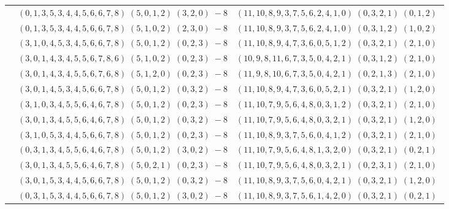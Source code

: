 \documentclass[11pt]{article}
\begin{document}
\begin{longtable}[l]{|c|c|c|}
 \cline{2-3} 
 & $(0 ,1 ,3 ,5 ,3 ,4 ,4 ,5 ,6 ,6 ,7 ,8) \;(5 ,0 ,1 ,2) \;(3 ,2 ,0) \;-8$ & $(11 ,10 ,8 ,9 ,3 ,7 ,5 ,6 ,2 ,4 ,1 ,0) \;(0 ,3 ,2 ,1) \;(0 ,1 ,2) \;$\\ 
 \cline{2-3} 
 & $(0 ,1 ,3 ,5 ,3 ,4 ,4 ,5 ,6 ,6 ,7 ,8) \;(5 ,1 ,0 ,2) \;(2 ,3 ,0) \;-8$ & $(11 ,10 ,8 ,9 ,3 ,7 ,5 ,6 ,2 ,4 ,1 ,0) \;(0 ,3 ,1 ,2) \;(1 ,0 ,2) \;$\\ 
 \cline{2-3} 
 & $(3 ,1 ,0 ,4 ,5 ,3 ,4 ,5 ,6 ,6 ,7 ,8) \;(5 ,0 ,1 ,2) \;(0 ,2 ,3) \;-8$ & $(11 ,10 ,8 ,9 ,4 ,7 ,3 ,6 ,0 ,5 ,1 ,2) \;(0 ,3 ,2 ,1) \;(2 ,1 ,0) \;$\\ 
 \cline{2-3} 
 & $(3 ,0 ,1 ,4 ,3 ,4 ,5 ,5 ,6 ,7 ,8 ,6) \;(5 ,1 ,0 ,2) \;(0 ,2 ,3) \;-8$ & $(10 ,9 ,8 ,11 ,6 ,7 ,3 ,5 ,0 ,4 ,2 ,1) \;(0 ,3 ,1 ,2) \;(2 ,1 ,0) \;$\\ 
 \cline{2-3} 
 & $(3 ,0 ,1 ,4 ,3 ,4 ,5 ,5 ,6 ,7 ,6 ,8) \;(5 ,1 ,2 ,0) \;(0 ,2 ,3) \;-8$ & $(11 ,9 ,8 ,10 ,6 ,7 ,3 ,5 ,0 ,4 ,2 ,1) \;(0 ,2 ,1 ,3) \;(2 ,1 ,0) \;$\\ 
 \cline{2-3} 
 & $(3 ,0 ,1 ,4 ,5 ,3 ,4 ,5 ,6 ,6 ,7 ,8) \;(5 ,0 ,1 ,2) \;(0 ,3 ,2) \;-8$ & $(11 ,10 ,8 ,9 ,4 ,7 ,3 ,6 ,0 ,5 ,2 ,1) \;(0 ,3 ,2 ,1) \;(1 ,2 ,0) \;$\\ 
 \cline{2-3} 
 & $(3 ,1 ,0 ,3 ,4 ,5 ,5 ,6 ,4 ,6 ,7 ,8) \;(5 ,0 ,1 ,2) \;(0 ,2 ,3) \;-8$ & $(11 ,10 ,7 ,9 ,5 ,6 ,4 ,8 ,0 ,3 ,1 ,2) \;(0 ,3 ,2 ,1) \;(2 ,1 ,0) \;$\\ 
 \cline{2-3} 
 & $(3 ,0 ,1 ,3 ,4 ,5 ,5 ,6 ,4 ,6 ,7 ,8) \;(5 ,0 ,1 ,2) \;(0 ,3 ,2) \;-8$ & $(11 ,10 ,7 ,9 ,5 ,6 ,4 ,8 ,0 ,3 ,2 ,1) \;(0 ,3 ,2 ,1) \;(1 ,2 ,0) \;$\\ 
 \cline{2-3} 
 & $(3 ,1 ,0 ,5 ,3 ,4 ,4 ,5 ,6 ,6 ,7 ,8) \;(5 ,0 ,1 ,2) \;(0 ,2 ,3) \;-8$ & $(11 ,10 ,8 ,9 ,3 ,7 ,5 ,6 ,0 ,4 ,1 ,2) \;(0 ,3 ,2 ,1) \;(2 ,1 ,0) \;$\\ 
 \cline{2-3} 
 & $(0 ,3 ,1 ,3 ,4 ,5 ,5 ,6 ,4 ,6 ,7 ,8) \;(5 ,0 ,1 ,2) \;(3 ,0 ,2) \;-8$ & $(11 ,10 ,7 ,9 ,5 ,6 ,4 ,8 ,1 ,3 ,2 ,0) \;(0 ,3 ,2 ,1) \;(0 ,2 ,1) \;$\\ 
 \cline{2-3} 
 & $(3 ,0 ,1 ,3 ,4 ,5 ,5 ,6 ,4 ,6 ,7 ,8) \;(5 ,0 ,2 ,1) \;(0 ,2 ,3) \;-8$ & $(11 ,10 ,7 ,9 ,5 ,6 ,4 ,8 ,0 ,3 ,2 ,1) \;(0 ,2 ,3 ,1) \;(2 ,1 ,0) \;$\\ 
 \cline{2-3} 
 & $(3 ,0 ,1 ,5 ,3 ,4 ,4 ,5 ,6 ,6 ,7 ,8) \;(5 ,0 ,1 ,2) \;(0 ,3 ,2) \;-8$ & $(11 ,10 ,8 ,9 ,3 ,7 ,5 ,6 ,0 ,4 ,2 ,1) \;(0 ,3 ,2 ,1) \;(1 ,2 ,0) \;$\\ 
 \cline{2-3} 
 & $(0 ,3 ,1 ,5 ,3 ,4 ,4 ,5 ,6 ,6 ,7 ,8) \;(5 ,0 ,1 ,2) \;(3 ,0 ,2) \;-8$ & $(11 ,10 ,8 ,9 ,3 ,7 ,5 ,6 ,1 ,4 ,2 ,0) \;(0 ,3 ,2 ,1) \;(0 ,2 ,1) \;$\\ 

\end{longtable}
\end{document}
